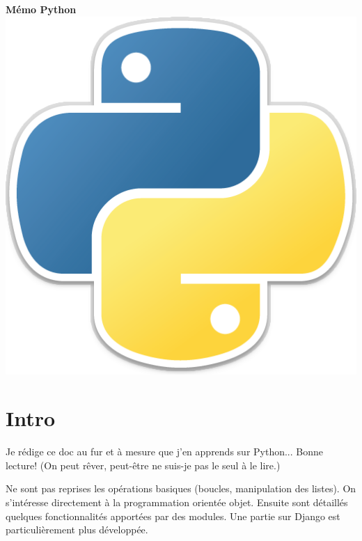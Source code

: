 \documentclass[a4paper, 10pt]{article}
\begin{document}

\begin{center}
        {\Huge{\sc\bfseries{Mémo Python}}}\\[20pt]
        \includegraphics[scale=0.1]{python.png}
        \vspace{20pt}
\end{center}

\tableofcontents

\hypersetup{linkcolor=blue}

\newpage
\section*{Intro}

Je rédige ce doc au fur et à mesure que j'en apprends sur Python... Bonne lecture! (On peut rêver, peut-être ne suis-je pas le seul à le lire.)\bigskip

Ne sont pas reprises les opérations \og basiques \fg{} (boucles, manipulation des listes). On s'intéresse directement à la programmation orientée objet. Ensuite sont détaillés quelques fonctionnalités apportées par des modules. Une partie sur Django est particulièrement plus développée.\bigskip
\end{document}
